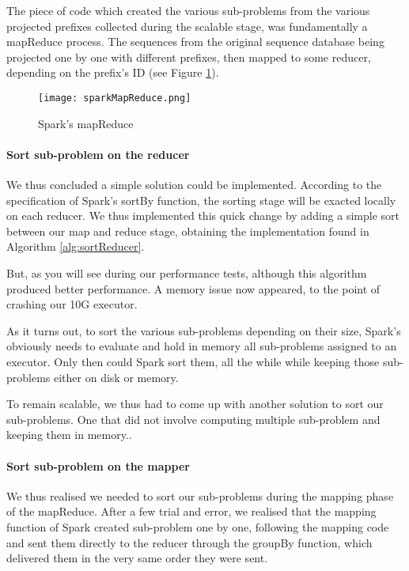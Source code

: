 \documentclass{eplmastersthesis}
\begin{document}
The piece of code which created the various sub-problems from the various projected prefixes collected during the scalable stage, was fundamentally a mapReduce process. The sequences from the original sequence database being projected one by one with different prefixes, then mapped to some reducer, depending on the prefix's ID 
(see Figure \ref{fig:sparkMapReduce}). \newline

\begin{figure}[h]
  \centering
  \texttt{[image: sparkMapReduce.png]}
  \caption{Spark's mapReduce}
  \label{fig:sparkMapReduce}
\end{figure}

\paragraph{Sort sub-problem on the reducer}

We thus concluded a simple solution could be implemented. According to the specification of Spark's sortBy function, the sorting stage will be exacted locally on each reducer. We thus implemented this quick change by adding a simple sort between our map and reduce stage, obtaining the implementation found in Algorithm \ref{alg:sortReducer}.

But, as you will see during our performance tests, although this algorithm produced better performance. A memory issue now appeared, to the point of crashing our 10G executor. \newline

As it turns out, to sort the various sub-problems depending on their size, Spark's obviously needs to evaluate and hold in memory all sub-problems assigned to an executor.
Only then could Spark sort them, all the while while keeping those sub-problems either on disk or memory. \newline

To remain scalable, we thus had to come up with another solution to sort our sub-problems. One that did not involve computing multiple sub-problem and keeping them in memory..

\paragraph{Sort sub-problem on the mapper}

We thus realised we needed to sort our sub-problems during the mapping phase of the mapReduce. After a few trial and error, we realised that the mapping function of Spark created sub-problem one by one, following the mapping code and sent them directly to the reducer through the groupBy function, which delivered them in the very same order they were sent. \newline
\end{document}
